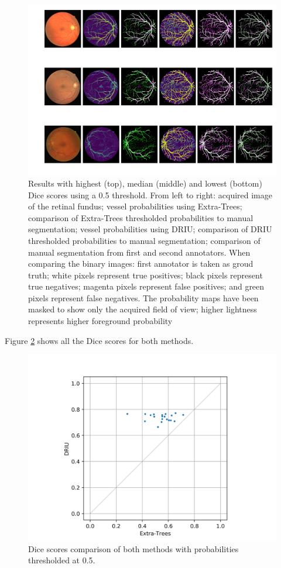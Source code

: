 \begin{figure}
  \includegraphics[width=\textwidth]{figures/collage}
  \caption{Results with highest (top), median (middle) and lowest (bottom) Dice scores using a 0.5 threshold. From left to right: acquired image of the retinal fundus; vessel probabilities using Extra-Trees; comparison of Extra-Trees thresholded probabilities to manual segmentation; vessel probabilities using DRIU; comparison of DRIU thresholded probabilities to manual segmentation; comparison of manual segmentation from first and second annotators. When comparing the binary images: first annotator is taken as groud truth; white pixels represent true positives; black pixels represent true negatives; magenta pixels represent false positives; and green pixels represent false negatives. The probability maps have been masked to show only the acquired field of view; higher lightness represents higher foreground probability} \label{fig:collage}
\end{figure}

Figure \ref{fig:dice} shows all the Dice scores for both methods.

\begin{figure}
  \includegraphics[width=\textwidth]{figures/dices}
  \caption{Dice scores comparison of both methods with probabilities thresholded at 0.5.} \label{fig:dice}
\end{figure}

